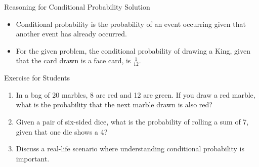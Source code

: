 \begin{frame}{Reasoning for Conditional Probability Solution}
  \begin{itemize}
    \item Conditional probability is the probability of an event occurring given that another event has already occurred.
    \item For the given problem, the conditional probability of drawing a King, given that the card drawn is a face card, is \(\frac{1}{12}\).
  \end{itemize}
\end{frame}

\begin{frame}{Exercise for Students}
  \begin{enumerate}
    \item In a bag of 20 marbles, 8 are red and 12 are green. If you draw a red marble, what is the probability that the next marble drawn is also red?
    \item Given a pair of six-sided dice, what is the probability of rolling a sum of 7, given that one die shows a 4?
    \item Discuss a real-life scenario where understanding conditional probability is important.
  \end{enumerate}
\end{frame}
